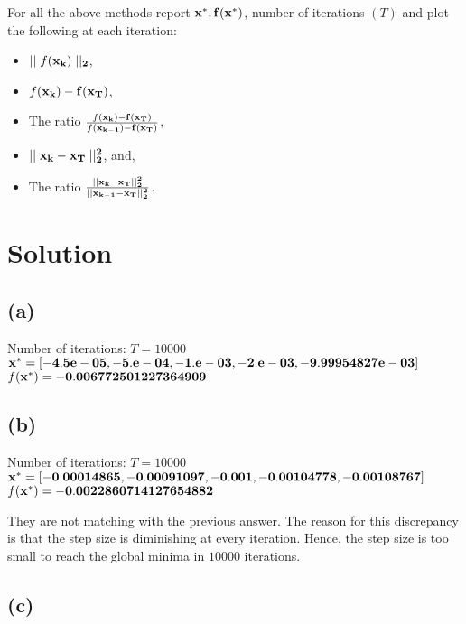 \documentclass{article}
\begin{document}
For all the above methods report $\bf{x^*}, f(\bf{x^*})$, number of iterations $(T)$ and plot the following at each iteration:

\begin{itemize}
    \item $\mid \mid f(\bf{x_k}) \mid \mid_2$,
    \item $f(\bf{x_k}) - f(\bf{x_T})$,
    \item The ratio $\frac{f(\bf{x_k}) - f(\bf{x_T})}{f(\bf{x_{k - 1}}) - f(\bf{x_T})}$,
    \item $\mid \mid \bf{x_k} - \bf{x_T} \mid \mid_2^2$, and,
    \item The ratio $\frac{\mid \mid \bf{x_k} - \bf{x_T} \mid \mid_2^2}{\mid \mid \bf{x_{k - 1}} - \bf{x_T} \mid \mid_2^2}$.
\end{itemize}

\section*{Solution}

\subsection*{(a)}

\begin{center}
    Number of iterations: $T = 10000$ \\
    $\bf{x^*} = [-4.5e-05, -5.e-04, -1.e-03, -2.e-03, -9.99954827e-03]$ \\
    $f(\bf{x^*}) = -0.006772501227364909$
\end{center}

\subsection*{(b)}

\begin{center}
    Number of iterations: $T = 10000$ \\
    $\bf{x^*} = [-0.00014865, -0.00091097, -0.001, -0.00104778, -0.00108767]$ \\
    $f(\bf{x^*}) = -0.0022860714127654882$
\end{center}

They are not matching with the previous answer. The reason for this discrepancy is that the step size is diminishing at every iteration. Hence, the step size is too small to reach the global minima in $10000$ iterations.

\subsection*{(c)}
\end{document}
